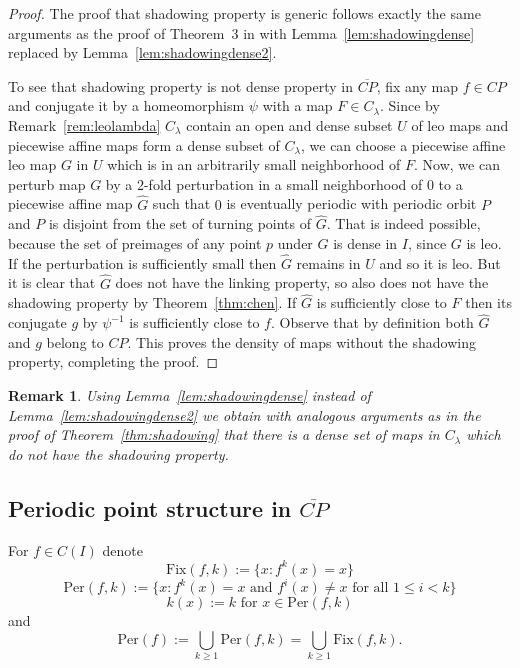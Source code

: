 \documentclass[12pt, a4paper]{amsart}
\newtheorem{remark}[theorem]{Remark}
\def\le{\leqslant}
\def\ge{\geqslant}
\def\per{\mathrm{Per}}
\newcommand{\?}{{\bf ???}}
\def\CP{\overline{CP}}
\newcommand{\fix}{\mathrm{Fix}}
\begin{document}
\begin{proof}
The proof that shadowing property is generic follows exactly the same arguments as the proof of Theorem~3 in \cite{BCOT} with Lemma~\ref{lem:shadowingdense} replaced by Lemma~\ref{lem:shadowingdense2}. 

To see that shadowing property is not dense property in $\CP$, fix any map $f\in CP$ and conjugate it by a homeomorphism $\psi$ with a map $F\in C_\lambda$. Since by Remark~\ref{rem:leolambda} $C_\lambda$ contain an open and dense subset $U$  of leo maps and piecewise affine maps form a dense subset of $C_\lambda$, we  can choose a piecewise affine leo  map $G$ in $U$ which is in  an arbitrarily small neighborhood of $F$. Now, we can perturb  map $G$ by a $2$-fold perturbation in a small neighborhood of $0$
to a piecewise affine map $\hat G$ such that $0$ is eventually periodic with periodic orbit $P$ and $P$ is disjoint from the set of turning points of  $\hat G$. That is indeed possible, because the set of preimages of any point $p$ under $G$ is dense in $I$, since $G$ is leo. If the perturbation is sufficiently small then $\hat G$ remains in $U$ and so it is leo. But it is clear that $\hat G$ does not have the linking property, so also does not have the shadowing property by Theorem~\ref{thm:chen}. If $\hat G$  is sufficiently close to $F$ then its conjugate $g$ by $\psi^{-1}$  is sufficiently close to $f$.  Observe that by definition both $\hat G$ and $g$ belong to $CP$.
This proves the density of maps without  the shadowing  property, completing the proof.
\end{proof}


\begin{remark}
Using Lemma~\ref{lem:shadowingdense} instead of Lemma~\ref{lem:shadowingdense2} we obtain with analogous arguments as in the proof of Theorem~\ref{thm:shadowing} that there is a dense set of maps in $C_\lambda$ which do not have the shadowing property.
\end{remark}


\subsection{Periodic point structure in $\CP$}\label{subsec:periodicpoints}
For $f\in C(I)$ denote 
$$\fix(f,k) := \{x: f^k(x) = x\}$$
$$\per(f,k) := \{x : f^k(x) = x \text{ and } f^i(x) \ne x  \text{ for all } 1 \le i < k
\}$$
$$k(x) := k \text{ for } x \in \per(f,k)$$
and
$$\per(f) := \bigcup_{k \ge 1} \per(f,k) = \bigcup_{k \ge 1} \fix(f,k).$$
\end{document}
